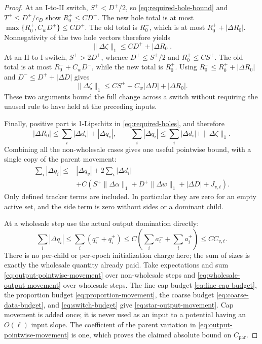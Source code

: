 \begin{proof}
At an I-to-II switch, \(S^+<D^+/2\), so
\eqref{eq:required-hole-bound} and \(T^+\le D^+/c_D\) show
\(R_0^+\le C D^+\).  The new hole total is at most
\(\max\{R_0^+,C_wD^+\}\le C D^+\).  The old total is \(R_0^-\),
which is at most \(R_0^++|\Delta R_0|\).  Nonnegativity of the
two hole vectors therefore yields
\begin{equation}
 \|\Delta\zeta\|_1\le C D^++|\Delta R_0|.
 \label{eq:hole-downcross}
\end{equation}
At an II-to-I switch, \(S^+>2D^+\), whence
\(D^+\le S^+/2\) and \(R_0^+\le C S^+\).  The old total is
at most \(R_0^-+C_wD^-\), while the new total is \(R_0^+\).
Using \(R_0^-\le R_0^++|\Delta R_0|\) and
\(D^-\le D^++|\Delta D|\) gives
\begin{equation}
 \|\Delta\zeta\|_1
 \le C S^++C_w|\Delta D|+|\Delta R_0|.
 \label{eq:hole-upcross}
\end{equation}
These two arguments bound the full change across a switch without
requiring the unused rule to have held at the preceding inputs.

Finally, positive part is 1-Lipschitz in
\eqref{eq:required-holes}, and therefore
\begin{equation}
 |\Delta R_0|\le\sum_i|\Delta d_i|+|\Delta q_v|,
 \qquad
 \sum_i|\Delta q_i|\le\sum_i|\Delta d_i|+\|\Delta\zeta\|_1.
 \label{eq:cap-parent-variation}
\end{equation}
Combining all the non-wholesale cases gives one useful pointwise
bound, with a single copy of the parent movement:
\begin{align}
 \sum_i|\Delta q_i|
 \le{}& |\Delta q_v|+2\sum_i|\Delta d_i|\nonumber\\
 &+C\left(S^+\|\Delta\alpha\|_1
        +D^+\|\Delta w\|_1+|\Delta D|+J_{v,t}\right).
 \label{eq:output-pointwise-movement}
\end{align}
Only defined tracker terms are included.  In particular they are
zero for an empty active set, and the side term is zero without
sides or a dominant child.

At a wholesale step use the actual output domination directly:
\begin{equation}
 \sum_i|\Delta q_i|
 \le\sum_i(q_i^-+q_i^+)
 \le C\left(\sum_i a_i^-+\sum_i a_i^+\right)
 \le C C_{v,t}.
 \label{eq:wholesale-output-movement}
\end{equation}
There is no per-child or per-epoch initialization charge here; the
sum of sizes is exactly the wholesale quantity already paid.
Take expectations and sum \eqref{eq:output-pointwise-movement} over
non-wholesale steps and \eqref{eq:wholesale-output-movement} over
wholesale steps.  The fine cap budget \eqref{eq:fine-cap-budget},
the proportion budget \eqref{eq:proportion-movement}, the coarse
budget \eqref{eq:coarse-data-budget}, and \eqref{eq:switch-budget}
give \eqref{eq:star-output-movement}.  Cap movement is added once;
it is never used as an input to a potential having an \(O(\ell)\)
input slope.  The coefficient of the parent variation in
\eqref{eq:output-pointwise-movement} is one, which proves the
claimed absolute bound on \(C_{\mathrm{par}}\).
\end{proof}

